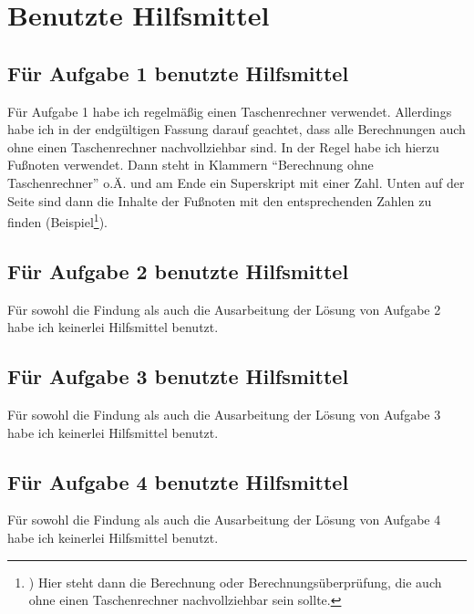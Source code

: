 \section*{Benutzte Hilfsmittel}

\subsection*{Für Aufgabe 1 benutzte Hilfsmittel}

Für Aufgabe 1 habe ich regelmäßig einen Taschenrechner verwendet. Allerdings habe ich in der endgültigen Fassung 
darauf geachtet, dass alle Berechnungen auch ohne einen Taschenrechner nachvollziehbar sind. In der Regel habe 
ich hierzu Fußnoten verwendet. Dann steht in Klammern "`Berechnung ohne Taschenrechner"' o.Ä. und am Ende ein 
Superskript mit einer Zahl. Unten auf der Seite sind dann die Inhalte der Fußnoten mit  den entsprechenden Zahlen 
zu finden (Beispiel\footnote{) Hier steht dann die Berechnung oder Berechnungsüberprüfung, die auch ohne einen 
Taschenrechner nachvollziehbar sein sollte.}).


\subsection*{Für Aufgabe 2 benutzte Hilfsmittel}

Für sowohl die Findung als auch die Ausarbeitung der Lösung von Aufgabe 2 habe ich keinerlei Hilfsmittel benutzt.

\subsection*{Für Aufgabe 3 benutzte Hilfsmittel}

Für sowohl die Findung als auch die Ausarbeitung der Lösung von Aufgabe 3 habe ich keinerlei Hilfsmittel benutzt.

\subsection*{Für Aufgabe 4 benutzte Hilfsmittel}

Für sowohl die Findung als auch die Ausarbeitung der Lösung von Aufgabe 4 habe ich keinerlei Hilfsmittel benutzt.